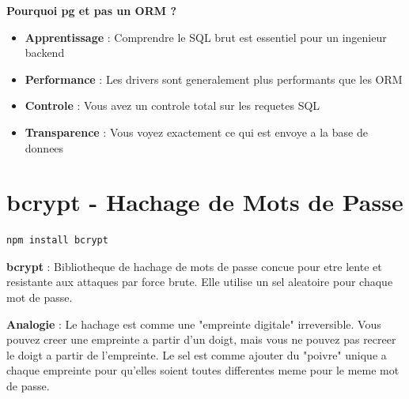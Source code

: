 \documentclass[a4paper,12pt]{book}
\begin{document}
\textbf{Pourquoi pg et pas un ORM ?}
\begin{itemize}
    \item \textbf{Apprentissage} : Comprendre le SQL brut est essentiel pour un ingenieur backend
    \item \textbf{Performance} : Les drivers sont generalement plus performants que les ORM
    \item \textbf{Controle} : Vous avez un controle total sur les requetes SQL
    \item \textbf{Transparence} : Vous voyez exactement ce qui est envoye a la base de donnees
\end{itemize}

\section{bcrypt - Hachage de Mots de Passe}

\begin{lstlisting}[style=bash, caption=Installation de bcrypt]
npm install bcrypt
\end{lstlisting}

\begin{definitionbox}
    \textbf{bcrypt} : Bibliotheque de hachage de mots de passe concue pour etre lente et resistante aux attaques par force brute. Elle utilise un sel aleatoire pour chaque mot de passe.
\end{definitionbox}

\begin{analogybox}
    \textbf{Analogie} : Le hachage est comme une "empreinte digitale" irreversible. Vous pouvez creer une empreinte a partir d'un doigt, mais vous ne pouvez pas recreer le doigt a partir de l'empreinte. Le sel est comme ajouter du "poivre" unique a chaque empreinte pour qu'elles soient toutes differentes meme pour le meme mot de passe.
\end{analogybox}

\end{document}
